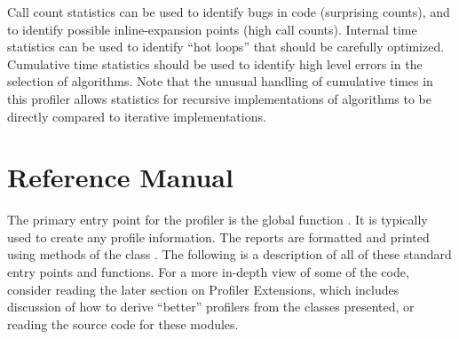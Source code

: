 Call count statistics can be used to identify bugs in code (surprising
counts), and to identify possible inline-expansion points (high call
counts).  Internal time statistics can be used to identify ``hot
loops'' that should be carefully optimized.  Cumulative time
statistics should be used to identify high level errors in the
selection of algorithms.  Note that the unusual handling of cumulative
times in this profiler allows statistics for recursive implementations
of algorithms to be directly compared to iterative implementations.


\section{Reference Manual}




The primary entry point for the profiler is the global function
.  It is typically used to create any profile
information.  The reports are formatted and printed using methods of
the class .  The following is a description of all
of these standard entry points and functions.  For a more in-depth
view of some of the code, consider reading the later section on
Profiler Extensions, which includes discussion of how to derive
``better'' profilers from the classes presented, or reading the source
code for these modules.

